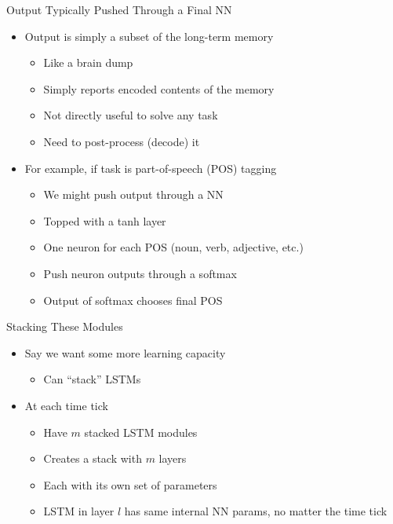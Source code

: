 \documentclass[aspectratio=169]{beamer}
\begin{document}
\begin{frame}{Output Typically Pushed Through a Final NN}

\begin{itemize}
	\item Output is simply a subset of the long-term memory
	\begin{itemize}
		\item Like a brain dump
		\item Simply reports encoded contents of the memory
		\item Not directly useful to solve any task
		\item Need to post-process (decode) it
	\end{itemize}
        \item For example, if task is part-of-speech (POS) tagging
        \begin{itemize}
                \item We might push output through a NN
		\item Topped with a tanh layer
		\item One neuron for each POS (noun, verb, adjective, etc.)
                \item Push neuron outputs through a softmax
		\item Output of softmax chooses final POS
        \end{itemize}
\end{itemize}
\end{frame}
\begin{frame}{Stacking These Modules}

\begin{itemize}
	\item Say we want some more learning capacity
	\begin{itemize}
                \item Can ``stack'' LSTMs
	\end{itemize}
	\item At each time tick
	\begin{itemize}
		\item Have $m$ stacked LSTM modules
		\item Creates a stack with $m$ layers
		\item Each with its own set of parameters
		\item LSTM in layer $l$ has same internal NN params, no matter the time tick
	\end{itemize}
\end{itemize}
\end{frame}
\end{document}
